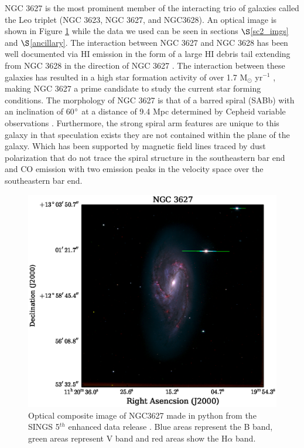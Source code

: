 NGC 3627 is the most prominent member of the interacting trio of galaxies called the Leo triplet (NGC 3623, NGC 3627,  and NGC3628).  An optical image is shown in Figure \ref{fig:ngc3627_opt} while the data we used can be seen in sections $\S$\ref{sc2_imgs} and $\S$\ref{ancillary}.  The interaction between NGC 3627 and NGC 3628 has been well documented via HI emission in the form of a large HI debris tail extending from NGC 3628 in the direction of NGC 3627 \citep{rots1978,haynes1979}.  The interaction between these galaxies has resulted in a high star formation activity of over 1.7 M$_\odot$ yr$^{-1}$ \citep{calzetti2010}, making NGC 3627 a prime candidate to study the current star forming conditions.  The morphology of NGC 3627 is that of a barred spiral (SABb) with an inclination of 60$\degree$ \citep{reuter1996} at a distance of 9.4 Mpc determined by Cepheid variable observations \citep{freedman2001}.  Furthermore, the strong spiral arm features are unique to this galaxy in that speculation exists they are not contained within the plane of the galaxy.  Which has been supported by magnetic field lines traced by dust polarization that do not trace the spiral structure in the southeastern bar end \citep{soida2001} and CO emission with two emission peaks in the velocity space over the southeastern bar end\citep{dumke2011}.

\begin{figure}
  \centering
  \includegraphics[width=1.\textwidth]{intro_imgs/rgb_tst.eps}
  \caption{Optical composite image of NGC3627 made in python from the SINGS 5$^{th}$ enhanced data release \citep{kennicutt2003}.  Blue areas represent the B band, green areas represent V band and red areas show the H$\alpha$ band.}
  \label{fig:ngc3627_opt}
\end{figure}

